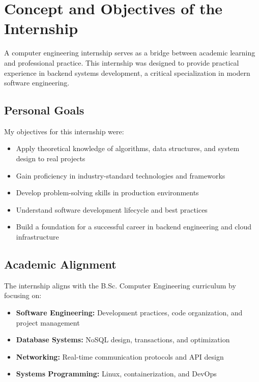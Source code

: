 
\section{Concept and Objectives of the Internship}

A computer engineering internship serves as a bridge between academic learning and professional practice. This internship was designed to provide practical experience in backend systems development, a critical specialization in modern software engineering.

\subsection{Personal Goals}

My objectives for this internship were:

\begin{itemize}
    \item Apply theoretical knowledge of algorithms, data structures, and system design to real projects
    \item Gain proficiency in industry-standard technologies and frameworks
    \item Develop problem-solving skills in production environments
    \item Understand software development lifecycle and best practices
    \item Build a foundation for a successful career in backend engineering and cloud infrastructure
\end{itemize}

\subsection{Academic Alignment}

The internship aligns with the B.Sc. Computer Engineering curriculum by focusing on:
\begin{itemize}
    \item \textbf{Software Engineering:} Development practices, code organization, and project management
    \item \textbf{Database Systems:} NoSQL design, transactions, and optimization
    \item \textbf{Networking:} Real-time communication protocols and API design
    \item \textbf{Systems Programming:} Linux, containerization, and DevOps
\end{itemize}

